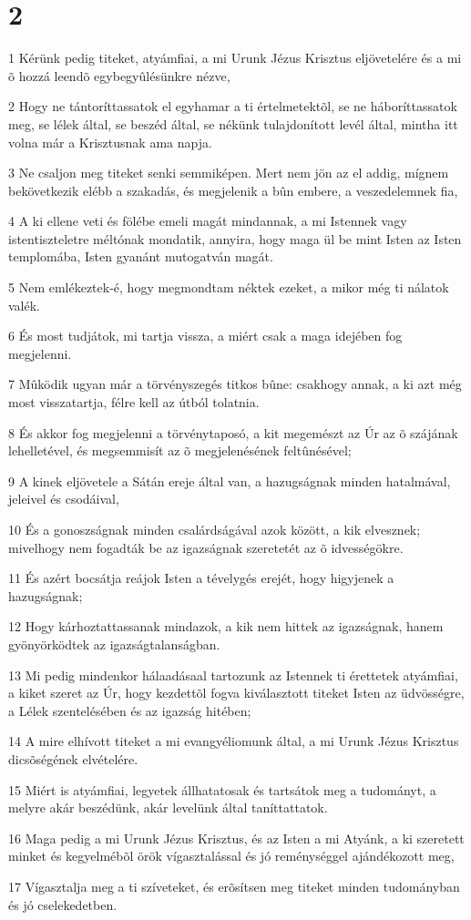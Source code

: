 \chapter{2}

\par 1 Kérünk pedig titeket, atyámfiai, a mi Urunk Jézus Krisztus eljövetelére és a mi õ hozzá leendõ egybegyûlésünkre nézve,
\par 2 Hogy ne tántoríttassatok el egyhamar a ti értelmetektõl, se ne háboríttassatok meg, se lélek által, se beszéd által, se nékünk tulajdonított levél által, mintha itt volna már a Krisztusnak ama napja.
\par 3 Ne csaljon meg titeket senki semmiképen. Mert nem jön az el addig, mígnem bekövetkezik elébb a szakadás, és megjelenik a bûn embere, a veszedelemnek fia,
\par 4 A ki ellene veti és fölébe emeli magát mindannak, a mi Istennek vagy istentiszteletre méltónak mondatik, annyira, hogy maga ül be mint Isten az Isten templomába, Isten gyanánt mutogatván magát.
\par 5 Nem emlékeztek-é, hogy megmondtam néktek ezeket, a mikor még ti nálatok valék.
\par 6 És most tudjátok, mi tartja vissza, a miért csak a maga idejében fog megjelenni.
\par 7 Mûködik ugyan már a törvényszegés titkos bûne: csakhogy annak, a ki azt még most visszatartja, félre kell az útból tolatnia.
\par 8 És akkor fog megjelenni a törvénytaposó, a kit megemészt az Úr az õ szájának lehelletével, és megsemmisít az õ megjelenésének feltûnésével;
\par 9 A kinek eljövetele a Sátán ereje által van, a hazugságnak minden hatalmával, jeleivel és csodáival,
\par 10 És a gonoszságnak minden csalárdságával azok között, a kik elvesznek; mivelhogy nem fogadták be az igazságnak szeretetét az õ idvességökre.
\par 11 És azért bocsátja reájok Isten a tévelygés erejét, hogy higyjenek a hazugságnak;
\par 12 Hogy kárhoztattassanak mindazok, a kik nem hittek az igazságnak, hanem gyönyörködtek az igazságtalanságban.
\par 13 Mi pedig mindenkor hálaadásaal tartozunk az Istennek ti érettetek atyámfiai, a kiket szeret az Úr, hogy kezdettõl fogva kiválasztott titeket Isten az üdvösségre, a Lélek szentelésében és az igazság hitében;
\par 14 A mire elhívott titeket a mi evangyéliomunk által, a mi Urunk Jézus Krisztus dicsõségének elvételére.
\par 15 Miért is atyámfiai, legyetek állhatatosak és tartsátok meg a tudományt, a melyre akár beszédünk, akár levelünk által taníttattatok.
\par 16 Maga pedig a mi Urunk Jézus Krisztus, és az Isten a mi Atyánk, a ki szeretett minket és kegyelmébõl örök vígasztalással és jó reménységgel ajándékozott meg,
\par 17 Vígasztalja meg a ti szíveteket, és erõsítsen meg titeket minden tudományban és jó cselekedetben.

